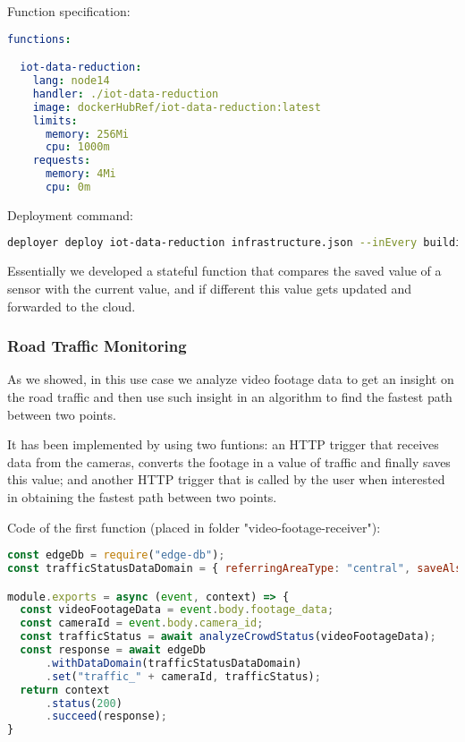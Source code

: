 Function specification:
\begin{lstlisting}[language=yaml,firstnumber=1]
functions:

  iot-data-reduction:
    lang: node14
    handler: ./iot-data-reduction
    image: dockerHubRef/iot-data-reduction:latest
    limits:
      memory: 256Mi
      cpu: 1000m
    requests:
      memory: 4Mi
      cpu: 0m
\end{lstlisting}

Deployment command:
\begin{lstlisting}[language=bash]
deployer deploy iot-data-reduction infrastructure.json --inEvery building --inAreas factory1 factory2
\end{lstlisting}

Essentially we developed a stateful function that compares the saved value of a sensor with the current value, and if different this value gets updated and forwarded to the cloud.


\subsubsection{Road Traffic Monitoring}
As we showed, in this use case we analyze video footage data to get an insight on the road traffic and then use such insight in an algorithm to find the fastest path between two points.

It has been implemented by using two funtions: an HTTP trigger that receives data from the cameras, converts the footage in a value of traffic and finally saves this value; and another HTTP trigger that is called by the user when interested in obtaining the fastest path between two points.

Code of the first function (placed in folder "video-footage-receiver"):
\begin{lstlisting}[language=javascript]
const edgeDb = require("edge-db");
const trafficStatusDataDomain = { referringAreaType: "central", saveAlsoInIntermediateLevels: true, ttl: 30*60*1000 }; // 30 minutes TTL.

module.exports = async (event, context) => {
  const videoFootageData = event.body.footage_data;
  const cameraId = event.body.camera_id;
  const trafficStatus = await analyzeCrowdStatus(videoFootageData);
  const response = await edgeDb
      .withDataDomain(trafficStatusDataDomain)
      .set("traffic_" + cameraId, trafficStatus);
  return context
      .status(200)
      .succeed(response);
}
\end{lstlisting}

